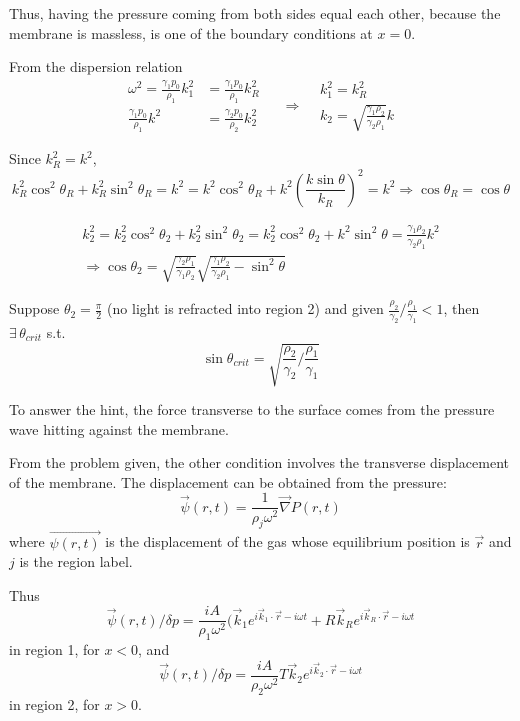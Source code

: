 \documentclass[twoside,10pt]{amsart}
\begin{document}
Thus, having the pressure coming from both sides equal each other, because the membrane is massless, is one of the boundary conditions at $x=0$.  

From the dispersion relation
\[
\begin{aligned}
  \omega^2 = \frac{ \gamma_1 p_0}{\rho_1} k_1^2 & = \frac{ \gamma_1 p_0 }{ \rho_1} k_R^2  \\ 
  \frac{ \gamma_1 p_0}{\rho_1} k^2 & = \frac{ \gamma_2 p_0}{\rho_2} k_2^2 
\end{aligned} \quad \, \Longrightarrow \begin{aligned} & k_1^2 = k_R^2 \\ & k_2 = \sqrt{ \frac{ \gamma_1 \rho_2}{\gamma_2 \rho_1 } } k \end{aligned}  
\]

Since $k_R^2 = k^2$, \[
k_R^2 \cos^2{\theta_R} + k_R^2 \sin^2{\theta_R} = k^2 = k^2 \cos^2{\theta_R} + k^2 \left( \frac{ k \sin{\theta} }{k_R }\right)^2 = k^2 \Longrightarrow \cos{\theta_R} = \cos{\theta}  
\]

\[
\begin{gathered}
  k_2^2 = k_2^2 \cos^2{\theta_2} + k_2^2 \sin^2{\theta_2} = k_2^2 \cos^2{\theta_2} + k^2 \sin^2{\theta} = \frac{ \gamma_1 \rho_2}{\gamma_2 \rho_1 }k^2 \\
  \Longrightarrow \cos{\theta_2} = \sqrt{ \frac{ \gamma_2 \rho_1}{ \gamma_1 \rho_2} } \sqrt{ \frac{ \gamma_1 \rho_2}{ \gamma_2 \rho_1} - \sin^2{\theta} }
\end{gathered}
\]

Suppose $\theta_2 = \frac{\pi}{2}$ (no light is refracted into region 2) and given $\frac{ \rho_2}{\gamma_2}/ \frac{ \rho_1}{\gamma_1} < 1$, then $\exists \, \theta_{crit}$ s.t. 
\[
\boxed{ \sin{\theta_{crit} } = \sqrt{ \frac{ \rho_2}{ \gamma_2} / \frac{ \rho_1}{ \gamma_1} } }
\]

To answer the hint, the force transverse to the surface comes from the pressure wave hitting against the membrane.  

From the problem given, the other condition involves the transverse displacement of the membrane.  The displacement can be obtained from the pressure:
\[
\vec{\psi}(r,t) = \frac{1}{ \rho_j \omega^2} \vec{\nabla}P(r,t)
\]
where $\vec{\psi(r,t)}$ is the displacement of the gas whose equilibrium position is $\vec{r}$ and $j$ is the region label.  

Thus 
\[
\vec{\psi}(r,t)/\delta p = \frac{ iA}{ \rho_1 \omega^2} ( \vec{k}_1 e^{ i \vec{k}_1 \cdot \vec{r} - i \omega t } + R \vec{k}_R e^{ i \vec{k}_R \cdot \vec{r} - i \omega t} 
\]
in region 1, for $x<0$, and 
\[
\vec{ \psi}(r,t)/\delta p = \frac{ i A}{ \rho_2 \omega^2 } T \vec{k}_2 e^{ i \vec{k}_2 \cdot \vec{r} - i\omega t}
\]
in region 2, for $x>0$.  
\end{document}
